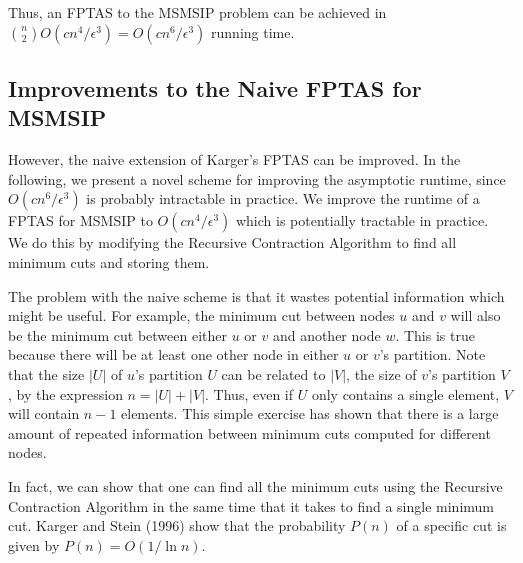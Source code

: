 \documentclass{article}
\theoremstyle{plain}
\begin{document}
Thus, an FPTAS to the MSMSIP problem can be achieved in ${n \choose 2} O(c n^4 / \epsilon^3) = O(c n^6 /\epsilon^3)$ running time.

\subsection{Improvements to the Naive FPTAS for MSMSIP}

However, the naive extension of Karger's FPTAS can be improved. In the following, we present a novel scheme for improving the asymptotic runtime, since $O(c n^6 / \epsilon^3)$ is probably intractable in practice. We improve the runtime of a FPTAS for MSMSIP to $O(c n^4 / \epsilon^3)$ which is potentially tractable in practice. We do this by modifying the Recursive Contraction Algorithm to find all minimum cuts and storing them.

The problem with the naive scheme is that it wastes potential information which might be useful. For example, the minimum cut between nodes $u$ and $v$ will also be the minimum cut between either $u$ or $v$ and another node $w$. This is true because there will be at least one other node in either $u$ or $v$'s partition. Note that the size $|U|$ of $u$'s partition $U$ can be related to $|V|$, the size of $v$'s partition $V$, by the expression $n = |U| + |V|$. Thus, even if $U$ only contains a single element, $V$ will contain $n-1$ elements. This simple exercise has shown that there is a large amount of repeated information between minimum cuts computed for different nodes.

In fact, we can show that one can find all the minimum cuts using the Recursive Contraction Algorithm in the same time that it takes to find a single minimum cut. Karger and Stein (1996) show that the probability $P(n)$ of a specific cut is given by $P(n) = O(1/ \ln n)$. 
\end{document}
